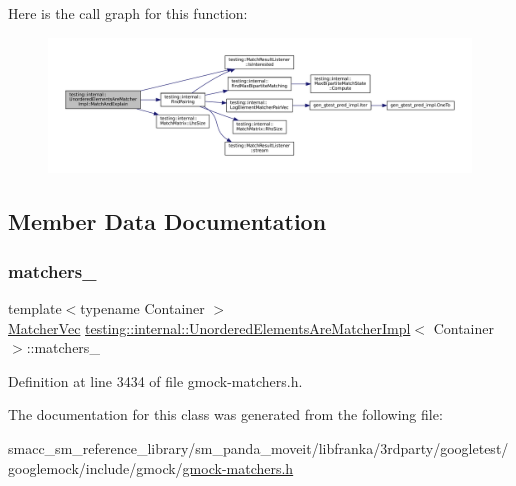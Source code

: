 Here is the call graph for this function\+:
\nopagebreak
\begin{figure}[H]
\begin{center}
\leavevmode
\includegraphics[width=350pt]{classtesting_1_1internal_1_1UnorderedElementsAreMatcherImpl_a4031291eef9be8c1e9e1effdd02c4334_cgraph}
\end{center}
\end{figure}


\subsection{Member Data Documentation}
\mbox{\label{classtesting_1_1internal_1_1UnorderedElementsAreMatcherImpl_a8f369b32578badf837a76ee66b033c81}} 
\subsubsection{\texorpdfstring{matchers\+\_\+}{matchers\_}}
{\footnotesize\ttfamily template$<$typename Container $>$ \\
\hyperlink{classtesting_1_1internal_1_1UnorderedElementsAreMatcherImpl_afc098105ab7ac15cba95ca34644f0cef}{Matcher\+Vec} \hyperlink{classtesting_1_1internal_1_1UnorderedElementsAreMatcherImpl}{testing\+::internal\+::\+Unordered\+Elements\+Are\+Matcher\+Impl}$<$ Container $>$\+::matchers\+\_\+\hspace{0.3cm}{\ttfamily [private]}}



Definition at line 3434 of file gmock-\/matchers.\+h.



The documentation for this class was generated from the following file\+:\begin{DoxyCompactItemize}
\item 
smacc\+\_\+sm\+\_\+reference\+\_\+library/sm\+\_\+panda\+\_\+moveit/libfranka/3rdparty/googletest/googlemock/include/gmock/\hyperlink{gmock-matchers_8h}{gmock-\/matchers.\+h}\end{DoxyCompactItemize}

